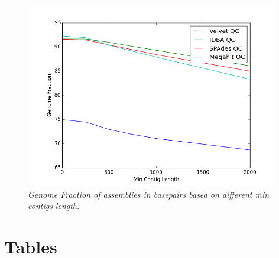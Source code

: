 \begin{figure} [h] 
\begin{center}  
 
\includegraphics[height=3.2in,width=4.5in]{gfmincontig.png}  
\caption{\small \sl Genome Fraction of assemblies in basepairs based on different min contigs length.\label{fig:gf}}  
\end{center}  
\end{figure}  

\section*{Tables}
% 
%
%






